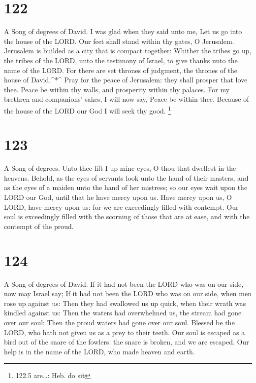 \hypertarget{section-122}{%
\section{122}\label{section-122}}

A Song of degrees of David.  I was glad when they said unto
me, Let us go into the house of the LORD.  Our feet shall
stand within thy gates, O Jerusalem.  Jerusalem is builded
as a city that is compact together:  Whither the tribes go
up, the tribes of the LORD, unto the testimony of Israel, to give thanks
unto the name of the LORD.  For there are set thrones of
judgment, the thrones of the house of David.\^{}*\^{}  Pray
for the peace of Jerusalem: they shall prosper that love thee.
 Peace be within thy walls, and prosperity within thy
palaces.  For my brethren and companions' sakes, I will now
say, Peace be within thee.  Because of the house of the LORD
our God I will seek thy good. \footnote{122.5 are\ldots: Heb. do sit}

\hypertarget{section-123}{%
\section{123}\label{section-123}}

A Song of degrees.  Unto thee lift I up mine eyes, O thou
that dwellest in the heavens.  Behold, as the eyes of
servants look unto the hand of their masters, and as the eyes of a
maiden unto the hand of her mistress; so our eyes wait upon the LORD our
God, until that he have mercy upon us.  Have mercy upon us,
O LORD, have mercy upon us: for we are exceedingly filled with contempt.
 Our soul is exceedingly filled with the scorning of those
that are at ease, and with the contempt of the proud.

\hypertarget{section-124}{%
\section{124}\label{section-124}}

A Song of degrees of David.  If it had not been the LORD who
was on our side, now may Israel say;  If it had not been the
LORD who was on our side, when men rose up against us:  Then
they had swallowed us up quick, when their wrath was kindled against us:
 Then the waters had overwhelmed us, the stream had gone
over our soul:  Then the proud waters had gone over our
soul.  Blessed be the LORD, who hath not given us as a prey
to their teeth.  Our soul is escaped as a bird out of the
snare of the fowlers: the snare is broken, and we are escaped.
 Our help is in the name of the LORD, who made heaven and
earth.

